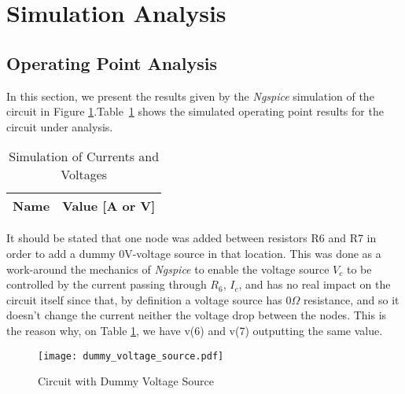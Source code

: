 \section{Simulation Analysis}
\label{sec:simulation}

\subsection{Operating Point Analysis}

In this section, we present the results given by the \emph{Ngspice} simulation of the circuit in Figure \ref{fig:alternative_circuit_for_ngspice}.Table~\ref{tab:op} shows the simulated operating point results for the circuit
under analysis.

\begin{table}[h]
  \centering
  \begin{tabular}{|l|r|}
    \hline    
    {\bf Name} & {\bf Value [A or V]} \\ \hline
    
  \end{tabular}
  \caption[Simulation of Currents and Voltages]{Simulation of Currents and Voltages\footnotemark}
  \label{tab:op}
\end{table}
It should be stated that one node was added between resistors R6 and R7 in order to add a dummy 0V-voltage source in that location. This was done as a work-around the mechanics of \emph{Ngspice} to enable the voltage source $V_c$ to be controlled by the current passing through $R_6$, $I_c$, and has no real impact on the circuit itself since that, by definition a voltage source has $0\Omega$ resistance, and so it doesn't change the current neither the voltage drop between the nodes. This is the reason why, on Table \ref{tab:op}, we have v(6) and v(7) outputting the same value.

\begin{figure}[h]
    \centering
    \texttt{[image: dummy\_voltage\_source.pdf]}
    \caption{Circuit with Dummy Voltage Source}
    \label{fig:alternative_circuit_for_ngspice}
\end{figure}

\clearpage



